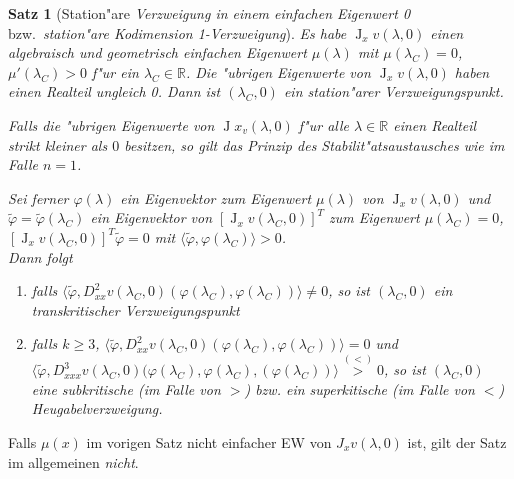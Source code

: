 \documentclass[a4paper, 13pt]{scrreprt}
\newtheorem{satz}{Satz}[section]
\theoremstyle{definition} \newtheorem{definition}{Definition}[section]
\newenvironment{bemerkung}[1][Bemerkung]{\begin{trivlist}
\item[\hskip \labelsep {\bfseries #1}]}{\end{trivlist}}
\newcommand{\RR}{\mathbb{R}}
\begin{document}
\begin{satz}[Station"are \emph{Verzweigung in einem einfachen Eigenwert 0} bzw.\ \emph{station"are \glqq Kodimension 1\grqq-Verzweigung}]
Es habe $\operatorname{J}_xv(\lambda,0)$ einen algebraisch und geometrisch einfachen Eigenwert $\mu(\lambda)$ mit $\mu(\lambda_C) = 0$, $\mu'(\lambda_C) > 0$ f"ur ein $\lambda_C \in \RR$. Die "ubrigen Eigenwerte von $\operatorname{J}_xv(\lambda,0)$ haben einen Realteil ungleich 0. Dann ist $(\lambda_C, 0)$ ein station"arer Verzweigungspunkt.

Falls die "ubrigen Eigenwerte von $\operatorname{J}x_v(\lambda,0)$ f"ur alle $\lambda\in\RR$ einen Realteil strikt kleiner als $0$ besitzen, so gilt das \emph{Prinzip des Stabilit"atsaustausches} wie im Falle $n = 1$.

Sei ferner $\varphi(\lambda)$ ein Eigenvektor zum Eigenwert $\mu(\lambda)$ von $\operatorname{J}_xv(\lambda,0)$ und $\tilde{\varphi} = \tilde{\varphi}(\lambda_C)$ ein Eigenvektor von $\left[\operatorname{J}_xv(\lambda_C,0)\right]^T$ zum Eigenwert $\mu(\lambda_C) = 0$, $\left[\operatorname{J}_xv(\lambda_C,0)\right]^T\tilde{\varphi} = 0$ mit $\langle\tilde{\varphi},\varphi(\lambda_C)\rangle > 0$. \\
Dann folgt
\begin{enumerate}
\item falls
$\langle\tilde{\varphi},D_{xx}^2v(\lambda_C,0)(\varphi(\lambda_C),\varphi(\lambda_C))\rangle\neq 0$, so ist $(\lambda_C,0)$ ein transkritischer Verzweigungspunkt

\item falls $k\geq 3$, 
$\langle\tilde{\varphi},D_{xx}^2v(\lambda_C,0)(\varphi(\lambda_C),\varphi(\lambda_C))\rangle = 0$ und\\ $\langle\tilde{\varphi},D_{xxx}^3v(\lambda_C,0)(\varphi(\lambda_C),\varphi(\lambda_C),(\varphi(\lambda_C))\rangle\stackrel{(<)}{>}0$, so ist $(\lambda_C,0)$ eine subkritische (im Falle von \glqq$>$\grqq) bzw. ein superkitische (im Falle von \glqq$<$\grqq) Heugabelverzweigung.

\end{enumerate}
\end{satz}

\begin{bemerkung}
Falls $\mu(x)$ im vorigen Satz nicht einfacher EW von $J_xv(\lambda,0)$ ist, gilt der Satz im allgemeinen \emph{nicht}.
\end{bemerkung}
\end{document}
